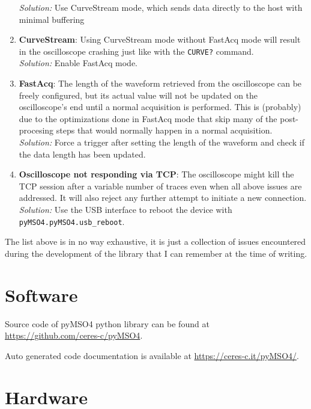 \documentclass[a4paper,english,twoside,10pt]{article}
\begin{document}
\begin{enumerate}[label=\textbf{P.\arabic*},ref=P.\arabic*]
	\textit{Solution:} Use CurveStream mode, which sends data directly to the host with minimal buffering
	\item \textbf{CurveStream}: Using CurveStream mode without FastAcq mode will result in the oscilloscope crashing just like with the \texttt{CURVE?} command.\\
	\textit{Solution:} Enable FastAcq mode.
	\item \textbf{FastAcq}\label{item:fastacq}: The length of the waveform retrieved from the oscilloscope can be freely configured, but its actual value will not be updated on the oscilloscope's end until a normal acquisition is performed. This is (probably) due to the optimizations done in FastAcq mode that skip many of the post-procesing steps that would normally happen in a normal acquisition.\\
	\textit{Solution:} Force a trigger after setting the length of the waveform and check if the data length has been updated.
	\item \textbf{Oscilloscope not responding via TCP}: The oscilloscope might kill the TCP session after a variable number of traces even when all above issues are addressed. It will also reject any further attempt to initiate a new connection.\\
	\textit{Solution:} Use the USB interface to reboot the device with \texttt{pyMSO4.pyMSO4.usb\_reboot}.
\end{enumerate}

The list above is in no way exhaustive, it is just a collection of issues encountered during the development of the library that I can remember at the time of writing.

\clearpage%
\printglossary[type=\acronymtype,nogroupskip]%
\printglossary[nogroupskip]%
\printindex%
{
\raggedright%
\nocite{ico:oscilloscope}
\nocite{ico:laptop}


}

\clearpage%
\appendix%
\section{Software}\label{app:software}
Source code of pyMSO4 python library can be found at \url{https://github.com/ceres-c/pyMSO4}.

\noindent Auto generated code documentation is available at \url{https://ceres-c.it/pyMSO4/}.
\section{Hardware}\label{app:hardware}
\end{document}
